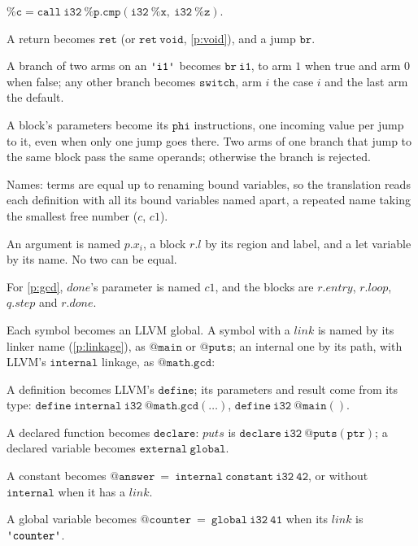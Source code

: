 \documentclass[11pt,letterpaper]{article}
\newcommand{\kw}[1]{\mathtt{#1}}
\newcommand{\str}[1]{\text{\ttfamily\textquotesingle #1\textquotesingle}}  %
\newcounter{pt}
\newcommand{\pref}[1]{\ref{#1}}  %
\begin{document}
\begin{points}
\begin{subpoints}
    $\kw{\%c = call\ i32\ \%p.cmp(i32\ \%x,\ i32\ \%z)}$.
  \item A return becomes $\kw{ret}$ (or $\kw{ret\ void}$, \pref{p:void}), and a jump $\kw{br}$.
  \item A branch of two arms on an $\str{i1}$ becomes $\kw{br\ i1}$, to arm $1$ when true and arm $0$ when false;
    any other branch becomes $\kw{switch}$, arm $i$ the case $i$ and the last arm the default.
  \item A block's parameters become its $\kw{phi}$ instructions, one incoming value per jump to it, even
    when only one jump goes there. Two arms of one branch that jump to the same block pass the same
    operands; otherwise the branch is rejected.
  \end{subpoints}
\item\label{p:names-llvm} Names: terms are equal up to renaming bound variables, so the translation reads
  each definition with all its bound variables named apart, a repeated name taking the smallest free
  number ($c$, $c1$).
  \begin{subpoints}
  \item An argument is named $p.x_i$, a block $r.l$ by its region and label, and a let variable by its name.
    No two can be equal.
  \item For \pref{p:gcd}, $\mathit{done}$'s parameter is named $c1$, and the blocks are $r.\mathit{entry}$,
    $r.\mathit{loop}$, $q.\mathit{step}$ and $r.\mathit{done}$.
  \end{subpoints}
\item\label{p:symbols-llvm} Each symbol becomes an LLVM global. A symbol with a $\mathit{link}$ is named by its
  linker name (\pref{p:linkage}), as $\kw{@main}$ or $\kw{@puts}$; an internal one by its path, with LLVM's
  $\kw{internal}$ linkage, as $\kw{@math.gcd}$:
  \begin{subpoints}
  \item A definition becomes LLVM's $\kw{define}$; its parameters and result come from its type:
    $\kw{define\ internal\ i32\ @math.gcd(\dots)}$, $\kw{define\ i32\ @main()}$.
  \item A declared function becomes $\kw{declare}$: $\mathit{puts}$ is
    $\kw{declare\ i32\ @puts(ptr)}$; a declared variable becomes $\kw{external\ global}$.
  \item A constant becomes $\kw{@answer\ =\ internal\ constant\ i32\ 42}$, or without $\kw{internal}$ when it has a $\mathit{link}$.
  \item A global variable becomes $\kw{@counter\ =\ global\ i32\ 41}$ when its $\mathit{link}$ is $\str{counter}$.

\end{subpoints}
\end{points}
\end{document}
